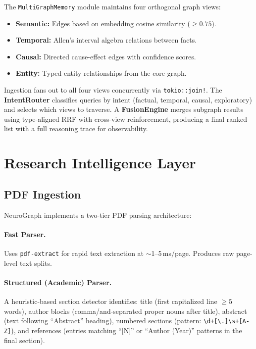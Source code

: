 \documentclass[11pt,twocolumn]{article}
\begin{document}
The \texttt{MultiGraphMemory} module maintains four orthogonal graph views:

\begin{itemize}[nosep]
  \item \textbf{Semantic:} Edges based on embedding cosine similarity ($\geq 0.75$).
  \item \textbf{Temporal:} Allen's interval algebra relations between facts.
  \item \textbf{Causal:} Directed cause-effect edges with confidence scores.
  \item \textbf{Entity:} Typed entity relationships from the core graph.
\end{itemize}

Ingestion fans out to all four views concurrently via \texttt{tokio::join!}. The \textbf{IntentRouter} classifies queries by intent (factual, temporal, causal, exploratory) and selects which views to traverse. A \textbf{FusionEngine} merges subgraph results using type-aligned RRF with cross-view reinforcement, producing a final ranked list with a full reasoning trace for observability.

\section{Research Intelligence Layer}
\label{sec:research}

\subsection{PDF Ingestion}

NeuroGraph implements a two-tier PDF parsing architecture:

\paragraph{Fast Parser.} Uses \texttt{pdf-extract} for rapid text extraction at $\sim$1--5\,ms/page. Produces raw page-level text splits.

\paragraph{Structured (Academic) Parser.} A heuristic-based section detector identifies: title (first capitalized line $\geq 5$ words), author blocks (comma/and-separated proper nouns after title), abstract (text following ``Abstract'' heading), numbered sections (pattern: \texttt{\textbackslash d+[\textbackslash.]\textbackslash s+[A-Z]}), and references (entries matching ``[N]'' or ``Author (Year)'' patterns in the final section).
\end{document}
